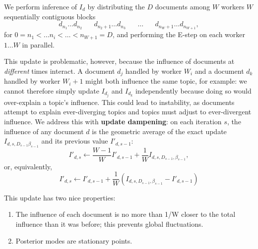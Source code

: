 We perform inference of $I_d$ by distributing the $D$ documents among $W$ workers
$W$ sequentially contiguous blocks 
\[
d_{n_1} \ldots d_{n_2} \hspace{20pt} d_{n_2 + 1} \ldots d_{n_3} \hspace{20pt} \ldots \hspace{20pt} d_{n_W + 1} \ldots d_{n_{W+1}},
\]
for $0 =
n_1 < \ldots n_i < \ldots < n_{W+1}=D$, and performing the E-step on
each worker $1 \ldots W$ in parallel. 

This update is problematic, however, because the influence of
documents at \emph{different} times interact.  A document $d_j$
handled by worker $W_i$ and a document $d_k$ handled by worker $W_i +
1$ might both influence the same topic, for example: we cannot
therefore simply update $I_{d_j}$ and $I_{d_k}$ independently because
doing so would over-explain a topic's influence.  This could lead to
instability, as documents attempt to explain ever-diverging topics and
topics must adjust to ever-divergent influence. We address this with
\textbf{update dampening}: on each iteration $s$, the influence of any
document $d$ is the geometric average of the exact update
$I_{d,s,D_{s-1}\beta_{s-1}}$ and its previous value $I'_{d,
{s-1}}$:
 \[
  I'_{d,s} \gets \frac{W-1}{W} I'_{d,{s-1}} + \frac{1}{W} I_{d,s, D_{s-1}, \beta_{s-1}},
\]
or, equivalently,
 \[
  I'_{d,s} \gets I'_{d,{s-1}} + \frac{1}{W} (I_{d,s, D_{s-1}, \beta_{s-1}} - I'_{d,{s-1}})
\]

This update has two nice properties:
\begin{enumerate}
  \item The influence of each document is no more than 1/W closer to the total influence than it was before; this prevents global fluctuations.
  \item Posterior modes are stationary points.
\end{enumerate}
